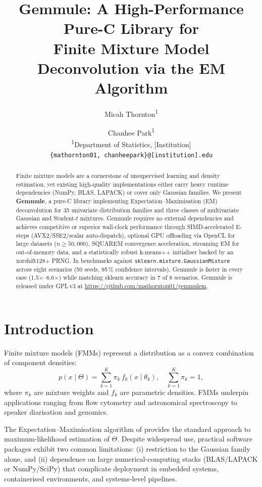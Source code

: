 ﻿\documentclass[10pt,twocolumn]{article}
\title{\textbf{Gemmule: A High-Performance Pure-C Library for\\
Finite Mixture Model Deconvolution via the EM Algorithm}}
\author{
  Micah Thornton\textsuperscript{1} \and Chanhee Park\textsuperscript{1}
  \\[4pt]
  \small\textsuperscript{1}Department of Statistics, [Institution]\\
  \small\texttt{\{mathornton01, chanheepark\}@[institution].edu}
}
\date{}
\begin{document}
\maketitle
\thispagestyle{empty}

\begin{abstract}
Finite mixture models are a cornerstone of unsupervised learning and density
estimation, yet existing high-quality implementations either carry heavy
runtime dependencies (NumPy, BLAS, LAPACK) or cover only Gaussian families.
We present \textbf{Gemmule}, a pure-C library implementing Expectation--Maximisation
(EM) deconvolution for 35 univariate distribution families and three classes
of multivariate Gaussian and Student-$t$ mixtures.
Gemmule requires no external dependencies and achieves competitive or
superior wall-clock performance through SIMD-accelerated E-steps
(AVX2/SSE2/scalar auto-dispatch), optional GPU offloading via OpenCL
for large datasets ($n \geq 50{,}000$), SQUAREM convergence acceleration,
streaming EM for out-of-memory data, and a statistically robust
\mbox{k-means++} initialiser backed by an xorshift128+ PRNG.
In benchmarks against \texttt{sklearn.mixture.GaussianMixture} across eight
scenarios (50 seeds, 95\,\% confidence intervals), Gemmule is faster in
every case (1.5$\times$--6.6$\times$) while matching sklearn accuracy in
7 of 8 scenarios.
Gemmule is released under GPL\,v3 at
\url{https://github.com/mathornton01/gemmulem}.
\end{abstract}

\section{Introduction}

Finite mixture models (FMMs) represent a distribution as a convex combination
of component densities:
\begin{equation}
  p(x \mid \Theta) = \sum_{k=1}^{K} \pi_k \, f_k(x \mid \theta_k),
  \quad \sum_{k=1}^{K} \pi_k = 1,
  \label{eq:fmm}
\end{equation}
where $\pi_k$ are mixture weights and $f_k$ are parametric densities.
FMMs underpin applications ranging from flow cytometry and astronomical
spectroscopy to speaker diarisation and genomics.

The Expectation--Maximisation algorithm of \citet{dempster1977maximum}
provides the standard approach to maximum-likelihood estimation of $\Theta$.
Despite widespread use, practical software packages exhibit two common
limitations: (i) restriction to the Gaussian family alone, and (ii)
dependence on large numerical-computing stacks (BLAS/LAPACK or NumPy/SciPy)
that complicate deployment in embedded systems, containerised environments,
and systems-level pipelines.
\end{document}

